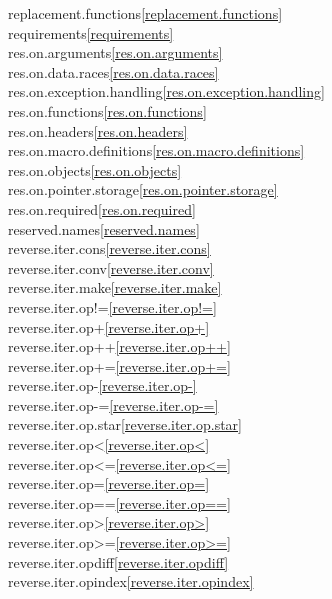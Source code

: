 \begin{multicols}{2}
replacement.functions\quad\ref{replacement.functions}\\
requirements\quad\ref{requirements}\\
res.on.arguments\quad\ref{res.on.arguments}\\
res.on.data.races\quad\ref{res.on.data.races}\\
res.on.exception.handling\quad\ref{res.on.exception.handling}\\
res.on.functions\quad\ref{res.on.functions}\\
res.on.headers\quad\ref{res.on.headers}\\
res.on.macro.definitions\quad\ref{res.on.macro.definitions}\\
res.on.objects\quad\ref{res.on.objects}\\
res.on.pointer.storage\quad\ref{res.on.pointer.storage}\\
res.on.required\quad\ref{res.on.required}\\
reserved.names\quad\ref{reserved.names}\\
reverse.iter.cons\quad\ref{reverse.iter.cons}\\
reverse.iter.conv\quad\ref{reverse.iter.conv}\\
reverse.iter.make\quad\ref{reverse.iter.make}\\
reverse.iter.op!=\quad\ref{reverse.iter.op!=}\\
reverse.iter.op+\quad\ref{reverse.iter.op+}\\
reverse.iter.op++\quad\ref{reverse.iter.op++}\\
reverse.iter.op+=\quad\ref{reverse.iter.op+=}\\
reverse.iter.op-\quad\ref{reverse.iter.op-}\\
reverse.iter.op-=\quad\ref{reverse.iter.op-=}\\
reverse.iter.op.star\quad\ref{reverse.iter.op.star}\\
reverse.iter.op<\quad\ref{reverse.iter.op<}\\
reverse.iter.op<=\quad\ref{reverse.iter.op<=}\\
reverse.iter.op=\quad\ref{reverse.iter.op=}\\
reverse.iter.op==\quad\ref{reverse.iter.op==}\\
reverse.iter.op>\quad\ref{reverse.iter.op>}\\
reverse.iter.op>=\quad\ref{reverse.iter.op>=}\\
reverse.iter.opdiff\quad\ref{reverse.iter.opdiff}\\
reverse.iter.opindex\quad\ref{reverse.iter.opindex}\\

\end{multicols}
